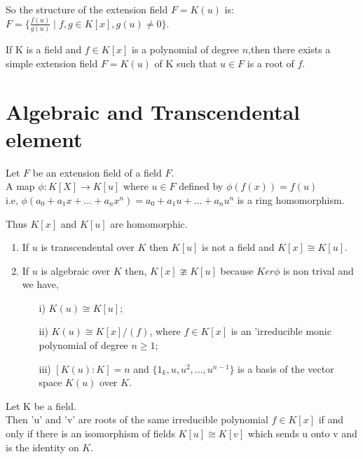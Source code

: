 So the structure of the extension field \(F=K(u)\) is:\\
\(F= \{\frac{f(u)}{g(u)} \;| \; f,g \in K[x],g(u) \neq 0\}\).\\

\begin{theorem}
If K is a field and \(f \in K[x]\) is a polynomial of degree \(n\),then there exists a simple extension field \(F=K(u)\) of K such that \(u\in F\) is a root of \(f\).~\cite{hunger}
\end{theorem}

\section{Algebraic and Transcendental element}
\begin{theorem}
Let \(F\) be an extension field of a field \(F\).\\
A map \(\phi:K[X] \rightarrow K[u]\) where \(u \in F\) defined by \(\phi (f(x))=f(u)\)\\
i.e, \(\phi (a_0+a_1x+...+a_nx^n)= a_0+a_1u+...+a_nu^n\) is a ring homomorphism.
\end{theorem}

Thus \( K[x]\) and \(K[u]\) are homomorphic.
  \begin{enumerate}
  \item If \(u\) is transcendental over \(K\) then \(K[u]\) is not a field and \(K[x] \cong K[u]\).
  \item If \(u\) is algebraic over \(K\) then, \(K[x] \ncong K[u]\) because \(Ker\phi\) is non trival and we have,
    \begin{enumerate}
    \item[i)] \(K(u) \cong K[u]\);
    \item[ii)] \(K(u) \cong K[x]/(f)\), where \(f \in K[x]\) is an 'irreducible monic polynomial of degree \(n \geq 1\);
    \item[iii)] \([K(u):K]=n\) and \(\{1_k,u,u^2,...,u^{n-1}\}\) is a basis of the vector space \(K(u)\) over \(K\).
    \end{enumerate}
  \end{enumerate}

\begin{theorem}
 Let K be a field.\\
 Then 'u' and 'v' are  roots of the same irreducible polynomial \(f \in K[x]\) if and only if there is an isomorphism of fields \(K[u] \cong K[v]\) which sends u onto v and is the identity on \(K\).
\end{theorem}



